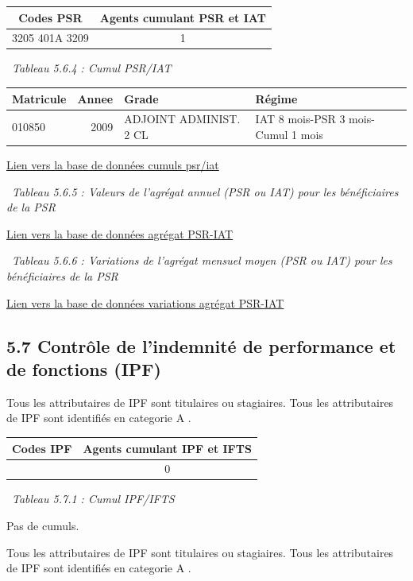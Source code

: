 \begin{longtable}[]{@{}cc@{}}
\toprule
Codes PSR & Agents cumulant PSR et IAT\tabularnewline
\midrule
\endhead
3205 401A 3209 & 1\tabularnewline
\bottomrule
\end{longtable}

~\emph{Tableau 5.6.4 : Cumul PSR/IAT}

\begin{longtable}[]{@{}lrll@{}}
\toprule
Matricule & Annee & Grade & Régime\tabularnewline
\midrule
\endhead
010850 & 2009 & ADJOINT ADMINIST. 2 CL & IAT 8 mois-PSR 3 mois-Cumul 1
mois\tabularnewline
\bottomrule
\end{longtable}

\href{../Bases/Reglementation/personnels.psr.iat.csv}{Lien vers la base de
données cumuls psr/iat}

~\emph{Tableau 5.6.5 : Valeurs de l'agrégat annuel (PSR ou IAT) pour les
bénéficiaires de la PSR}

\href{../Bases/Remunerations/beneficiaires.PSR.IAT.csv}{Lien vers la base
de données agrégat PSR-IAT}

~\emph{Tableau 5.6.6 : Variations de l'agrégat mensuel moyen (PSR ou
IAT) pour les bénéficiaires de la PSR}

\href{../Bases/Remunerations/beneficiaires.PSR.IAT.Variation.csv}{Lien vers
la base de données variations agrégat PSR-IAT}

\hypertarget{controle-de-lindemnite-de-performance-et-de-fonctions-ipf}{%
\subsection{5.7 Contrôle de l'indemnité de performance et de fonctions
(IPF)}\label{controle-de-lindemnite-de-performance-et-de-fonctions-ipf}}

Tous les attributaires de IPF sont titulaires ou stagiaires. Tous les
attributaires de IPF sont identifiés en categorie A .

\begin{longtable}[]{@{}cc@{}}
\toprule
Codes IPF & Agents cumulant IPF et IFTS\tabularnewline
\midrule
\endhead
& 0\tabularnewline
\bottomrule
\end{longtable}

~\emph{Tableau 5.7.1 : Cumul IPF/IFTS}

Pas de cumuls.

Tous les attributaires de IPF sont titulaires ou stagiaires. Tous les
attributaires de IPF sont identifiés en categorie A .

